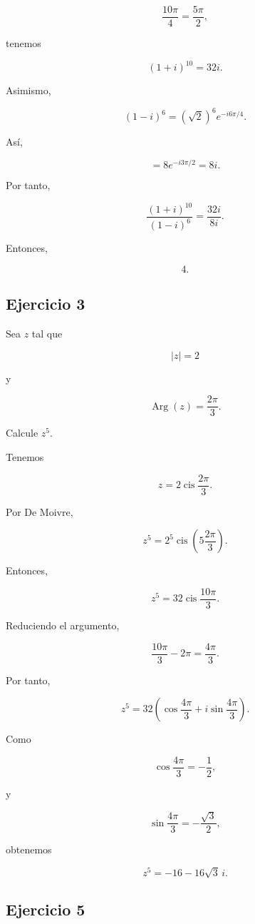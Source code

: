 \documentclass[12pt]{article}
\begin{document}
\[
\frac{10\pi}{4}
=
\frac{5\pi}{2},
\]

tenemos

\[
(1+i)^{10}
=
32i.
\]

Asimismo,

\[
(1-i)^6
=
(\sqrt2)^6e^{-i6\pi/4}.
\]

Así,

\[
=
8e^{-i3\pi/2}
=
8i.
\]

Por tanto,

\[
\frac{(1+i)^{10}}{(1-i)^6}
=
\frac{32i}{8i}.
\]

Entonces,

\[
\boxed{4}.
\]


\subsection*{Ejercicio 3}

Sea \(z\) tal que

\[
|z|=2
\]

y

\[
\operatorname{Arg}(z)=\frac{2\pi}{3}.
\]

Calcule \(z^5\).

Tenemos

\[
z
=
2\operatorname{cis}\frac{2\pi}{3}.
\]

Por De Moivre,

\[
z^5
=
2^5
\operatorname{cis}
\left(
5\frac{2\pi}{3}
\right).
\]

Entonces,

\[
z^5
=
32
\operatorname{cis}\frac{10\pi}{3}.
\]

Reduciendo el argumento,

\[
\frac{10\pi}{3}-2\pi
=
\frac{4\pi}{3}.
\]

Por tanto,

\[
z^5
=
32
\left(
\cos\frac{4\pi}{3}
+i\sin\frac{4\pi}{3}
\right).
\]

Como

\[
\cos\frac{4\pi}{3}
=
-\frac12,
\]

y

\[
\sin\frac{4\pi}{3}
=
-\frac{\sqrt3}{2},
\]

obtenemos

\[
\boxed{
z^5=-16-16\sqrt3\,i
}.
\]


\subsection*{Ejercicio 5}
\end{document}
